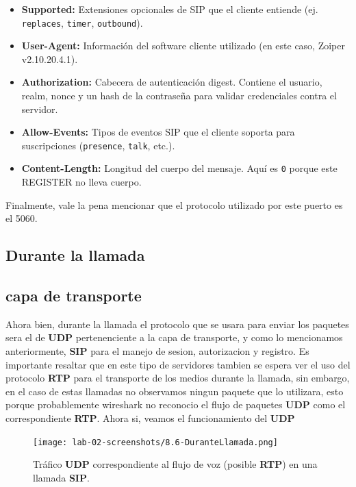\documentclass[10pt]{article}
\begin{document}
\begin{itemize}
    \item \textbf{Supported:} Extensiones opcionales de SIP que el cliente entiende (ej. \texttt{replaces}, \texttt{timer}, \texttt{outbound}).

    \item \textbf{User-Agent:} Información del software cliente utilizado (en este caso, Zoiper v2.10.20.4.1).

    \item \textbf{Authorization:} Cabecera de autenticación digest. Contiene el usuario, realm, nonce y un hash de la contraseña
    para validar credenciales contra el servidor.

    \item \textbf{Allow-Events:} Tipos de eventos SIP que el cliente soporta para suscripciones (\texttt{presence}, \texttt{talk}, etc.).

    \item \textbf{Content-Length:} Longitud del cuerpo del mensaje. Aquí es \texttt{0} porque este REGISTER no lleva cuerpo.
\end{itemize}
Finalmente, vale la pena mencionar que el protocolo utilizado por este puerto es el 5060. 
\subsection{Durante la llamada}
\subsection*{capa de transporte}
Ahora bien, durante la llamada el protocolo que se usara para enviar los paquetes sera el de \textbf{UDP} pertenenciente a la capa de transporte, y como lo mencionamos anteriormente, \textbf{SIP} para el manejo de sesion, autorizacion y registro.  Es importante resaltar que en este tipo de servidores tambien se espera ver el uso del protocolo \textbf{RTP} para el transporte de los medios durante la llamada, sin embargo, en el caso de estas llamadas no observamos ningun paquete que lo utilizara, esto porque probablemente wireshark no reconocio el flujo de paquetes \textbf{UDP} como el correspondiente \textbf{RTP}. Ahora si, veamos el funcionamiento del \textbf{UDP}

\begin{figure}[H]
    \centering
    \texttt{[image: lab-02-screenshots/8.6-DuranteLlamada.png]}
    \caption{Tráfico \textbf{UDP} correspondiente al flujo de voz (posible \textbf{RTP}) en una llamada \textbf{SIP}.}
\end{figure}
\end{document}
